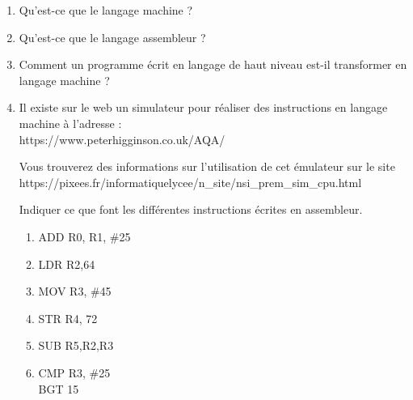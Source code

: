 \documentclass[11pt,a4paper]{article}
\begin{document}
\begin{enumerate}
\item Qu'est-ce que le langage machine ? \vspace{3cm}
\item Qu'est-ce que le langage assembleur ? \vspace{3cm}
\item Comment un programme écrit en langage de haut niveau est-il transformer en langage machine ?\vspace{3cm}

\item Il existe sur le web un simulateur pour réaliser des instructions en langage machine à l'adresse : \\
\textsf{https://www.peterhigginson.co.uk/AQA/}\medskip

Vous trouverez des informations sur l'utilisation de cet émulateur sur le site \\
\textsf{https://pixees.fr/informatiquelycee/n\_site/nsi\_prem\_sim\_cpu.html}\medskip

Indiquer ce que font les différentes instructions écrites en assembleur.\medskip
\begin{enumerate}

\item ADD R0, R1, \#25 \vspace{1.5cm}
\item LDR R2,64 \vspace{1.5cm}
\item MOV R3, \#45 \vspace{1.5cm}
\item STR R4, 72 \vspace{1.5cm}
\item SUB R5,R2,R3 \vspace{1.5cm}
\item CMP R3, \#25 \\
\hspace{0.5cm}BGT 15 \vspace{1.5cm}
\end{enumerate}


\end{enumerate}
\end{document}

